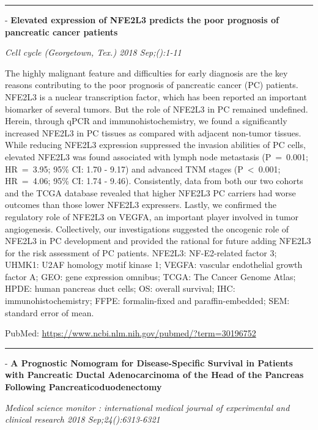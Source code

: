 \documentclass[]{article}
\begin{document}
\begin{center}\rule{0.5\linewidth}{\linethickness}\end{center}

 - \textbf{Elevated expression of NFE2L3 predicts the poor prognosis of
pancreatic cancer patients}

\emph{Cell cycle (Georgetown, Tex.) 2018 Sep;():1-11}

The highly malignant feature and difficulties for early diagnosis are
the key reasons contributing to the poor prognosis of pancreatic cancer
(PC) patients. NFE2L3 is a nuclear transcription factor, which has been
reported an important biomarker of several tumors. But the role of
NFE2L3 in PC remained undefined. Herein, through qPCR and
immunohistochemistry, we found a significantly increased NFE2L3 in PC
tissues as compared with adjacent non-tumor tissues. While reducing
NFE2L3 expression suppressed the invasion abilities of PC cells,
elevated NFE2L3 was found associated with lymph node metastasis
(P~=~0.001; HR~=~3.95; 95\% CI: 1.70 - 9.17) and advanced TNM stages
(P~\textless{}~0.001; HR~=~4.06; 95\% CI: 1.74 - 9.46). Consistently,
data from both our two cohorts and the TCGA database revealed that
higher NFE2L3 PC carriers had worse outcomes than those lower NFE2L3
expressers. Lastly, we confirmed the regulatory role of NFE2L3 on VEGFA,
an important player involved in tumor angiogenesis. Collectively, our
investigations suggested the oncogenic role of NFE2L3 in PC development
and provided the rational for future adding NFE2L3 for the risk
assessment of PC patients. NFE2L3: NF-E2-related factor 3; UHMK1: U2AF
homology motif kinase 1; VEGFA: vascular endothelial growth factor A;
GEO: gene expression omnibus; TCGA: The Cancer Genome Atlas; HPDE: human
pancreas duct cells; OS: overall survival; IHC: immunohistochemistry;
FFPE: formalin-fixed and paraffin-embedded; SEM: standard error of mean.

PubMed: \url{https://www.ncbi.nlm.nih.gov/pubmed/?term=30196752}

{}

{}

\begin{center}\rule{0.5\linewidth}{\linethickness}\end{center}

 - \textbf{A Prognostic Nomogram for Disease-Specific Survival in
Patients with Pancreatic Ductal Adenocarcinoma of the Head of the
Pancreas Following Pancreaticoduodenectomy}

\emph{Medical science monitor : international medical journal of
experimental and clinical research 2018 Sep;24():6313-6321}
\end{document}

